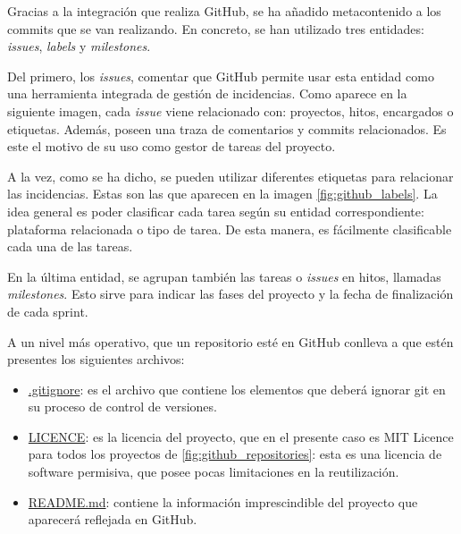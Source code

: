 Gracias a la integración que realiza GitHub, se ha añadido metacontenido a los commits que se van realizando. En concreto, se han utilizado tres entidades: \textit{issues}, \textit{labels} y \textit{milestones}.


Del primero, los \textit{issues}, comentar que GitHub permite usar esta entidad como una herramienta integrada de gestión de incidencias. Como aparece en la siguiente imagen, cada \textit{issue} viene relacionado con: proyectos, hitos, encargados o etiquetas. Además, poseen una traza de comentarios y commits relacionados. Es este el motivo de su uso como gestor de tareas del proyecto.


A la vez, como se ha dicho, se pueden utilizar diferentes etiquetas para relacionar las incidencias. Estas son las que aparecen en la imagen \ref{fig:github_labels}. La idea general es poder clasificar cada tarea según su entidad correspondiente: plataforma relacionada o tipo de tarea. De esta manera, es fácilmente clasificable cada una de las tareas.


En la última entidad, se agrupan también las tareas o \textit{issues} en hitos, llamadas \textit{milestones}. Esto sirve para indicar las fases del proyecto y la fecha de finalización de cada sprint.

A un nivel más operativo, que un repositorio esté en GitHub conlleva a que estén presentes los siguientes archivos:

\begin{itemize}
    \item \underline{.gitignore}: es el archivo que contiene los elementos que deberá ignorar git en su proceso de control de versiones.
    \item \underline{LICENCE}: es la licencia del proyecto, que en el presente caso es MIT Licence para todos los proyectos de \ref{fig:github_repositories}: esta es una licencia de software permisiva, que posee pocas limitaciones en la reutilización.
    \item \underline{README.md}: contiene la información imprescindible del proyecto que aparecerá reflejada en GitHub.
\end{itemize}

